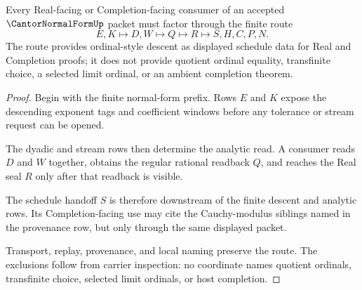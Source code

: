 \begin{theorem}
\label{thm:cantor-normal-form-real-completion-route}
Every Real-facing or Completion-facing consumer of an accepted $\CantorNormalFormUp$ packet must factor through the finite route
$$
E,K \longmapsto D,W \longmapsto Q \longmapsto R \longmapsto S,H,C,P,N .
$$
The route provides ordinal-style descent as displayed schedule data for Real and Completion proofs; it does not provide quotient ordinal equality, transfinite choice, a selected limit ordinal, or an ambient completion theorem.
\end{theorem}
\begin{proof}
Begin with the finite normal-form prefix. Rows $E$ and $K$ expose the descending exponent tags and coefficient windows before any tolerance or stream request can be opened.

The dyadic and stream rows then determine the analytic read. A consumer reads $D$ and $W$ together, obtains the regular rational readback $Q$, and reaches the Real seal $R$ only after that readback is visible.

The schedule handoff $S$ is therefore downstream of the finite descent and analytic rows. Its Completion-facing use may cite the Cauchy-modulus siblings named in the provenance row, but only through the same displayed packet.

Transport, replay, provenance, and local naming preserve the route. The exclusions follow from carrier inspection: no coordinate names quotient ordinals, transfinite choice, selected limit ordinals, or host completion.
\end{proof}





